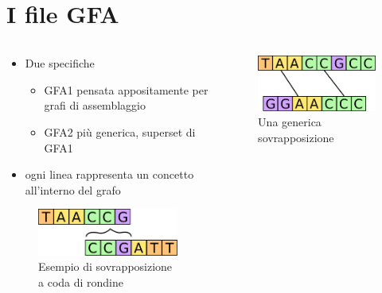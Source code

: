 \documentclass{beamer}
\begin{document}
 \section{I file GFA}
 \begin{frame}[fragile]{\secname}
 	\begin{columns}[b, onlytextwidth]
 		\begin{column}{0.7\textwidth}
 			\begin{itemize}
				\item Due specifiche
					\begin{itemize}
							\item GFA1 pensata appositamente per grafi di assemblaggio
							\item GFA2 più generica, superset di GFA1
					\end{itemize}					
				\item ogni linea rappresenta un concetto
					all'interno del grafo
 			\end{itemize}
 			\begin{figure}
 				\centering
 				\captionsetup{justification=centering}
 				\includegraphics[scale=0.30]{dov_ov_++}
 				\caption{Esempio di sovrapposizione\\a coda di rondine}
 			\end{figure}
 		\end{column}
 		\begin{column}{0.3\textwidth}
 			\begin{figure}
 				\centering
 				\captionsetup{justification=centering}
 				\includegraphics[scale=0.27]{generic-overlap}
 				\caption{Una generica sovrapposizione}
 			\end{figure}
 		\end{column}
 	\end{columns}
 \end{frame}
\end{document}
